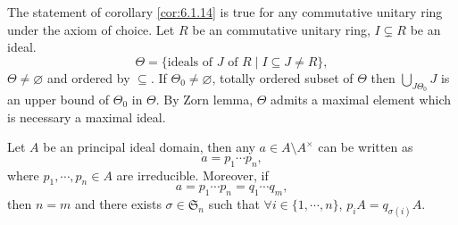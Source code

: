 \begin{remark}\label{6.1.15}
    The statement of corollary \ref{cor:6.1.14} is true for any commutative unitary ring under the axiom of choice.
    Let $R$ be an commutative unitary ring, $I \subsetneq R$ be an ideal.
    $$\Theta = \{\text{ideals of $J$ of } R \mid I \subseteq J \neq R\},$$
    $\Theta \neq \varnothing$ and ordered by $\subseteq$.
    If $\Theta_0 \neq \varnothing$, totally ordered subset of $\Theta$ then $\bigcup_{J \Theta_0} J$ is an upper bound of $\Theta_0$ in $\Theta$.
    By Zorn lemma, $\Theta$ admits a maximal element which is necessary a maximal ideal.
\end{remark}

\begin{propositionenv}\label{prop:6.1.16}
    Let $A$ be an principal ideal domain,
    then any $a \in A\setminus A^\times$ can be written as 
    $$a = p_1 \cdots p_n,$$
    where $p_1,\cdots, p_n \in A$ are irreducible.
    Moreover, if
    $$a = p_1 \cdots p_n = q_1 \cdots q_m,$$
    then $n = m$ and there exists $\sigma \in \mathfrak{S}_n$ such that $\forall i \in \{1,\cdots,n\}$,
    $p_i A = q_{\sigma(i)} A.$
\end{propositionenv}
